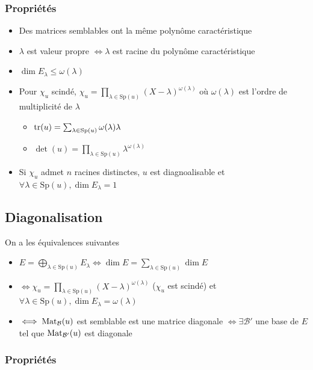 \documentclass[openany]{book}
\begin{document}
\subsubsection{Propriétés}

\begin{itemize}
    \item Des matrices semblables ont la même polynôme caractéristique
    \item $\lambda$ est valeur propre $\iff \lambda$ est racine du polynôme caractéristique
    \item $\dim E_{\lambda} \leq \omega (\lambda)$
    \item Pour $\chi_u$ scindé, $\chi_u = \prod_{\lambda \in \text{Sp} (u)} (X-\lambda)^{\omega(\lambda)}$ où $\omega(\lambda)$ est l'ordre de multiplicité de $\lambda$ 
    \begin{itemize}
        \item $\text{tr} (u) = \sum_{\lambda \in \text{Sp}(u)} \omega(\lambda) \lambda$
        \item $\det (u) = \prod_{\lambda \in \text{Sp}(u)} \lambda^{\omega(\lambda)}$
    \end{itemize}
    \item Si $\chi_u$ admet $n$ racines distinctes, $u$ est diagnoalisable et $\forall \lambda \in \text{Sp}(u), \dim E_\lambda = 1$
\end{itemize}

\subsection{Diagonalisation}

On a les équivalences suivantes
\begin{itemize}
    \item $E = \bigoplus_{\lambda \in \text{Sp}(u)}E_\lambda \iff \dim E = \sum_{\lambda \in \text{Sp}(u)} \dim E$
    \item $\iff \chi_u = \prod_{\lambda \in \text{Sp} (u)} (X-\lambda)^{\omega(\lambda)}$ ($\chi_u$ est scindé) et $\forall \lambda \in \text{Sp}(u), \dim E_\lambda = \omega(\lambda)$ 
    \item $\iff \text{Mat}_{\mathcal{B}}(u)$ est semblable est une matrice diagonale $\iff \exists \mathcal{B}'$ une base de $E$ tel que $\text{Mat}_{\mathcal{B}'}(u)$ est diagonale
\end{itemize}

\subsubsection{Propriétés}
\end{document}
